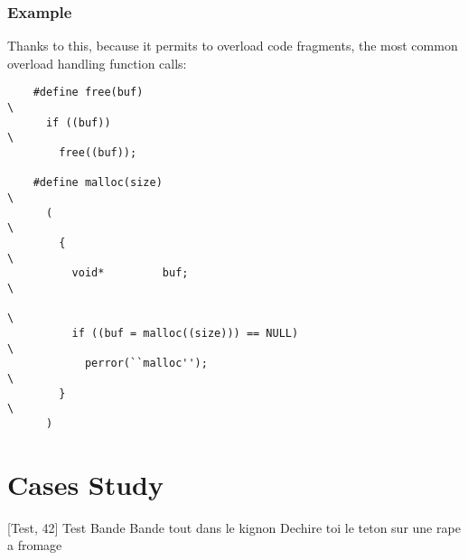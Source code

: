 \documentclass[9pt]{beamer}
\begin{document}
\begin{frame}[containsverbatim]
  \frametitle{Example}

  Thanks to this, because it permits to overload code fragments, the most
  common overload handling function calls:

  \begin{verbatim}
    #define free(buf)                                                   \
      if ((buf))                                                        \
        free((buf));

    #define malloc(size)                                                \
      (                                                                 \
        {                                                               \
          void*         buf;                                            \
                                                                        \
          if ((buf = malloc((size))) == NULL)                           \
            perror(``malloc'');                                         \
        }                                                               \
      )
  \end{verbatim}
\end{frame}

\section{Cases Study}


%
%

\begin{thebibliography}{10}

  \bibitem{Test}[Test, 42]
    Test Bande
    \newblock Bande tout dans le kignon
    \newblock Dechire toi le teton sur une rape a fromage

\end{thebibliography}
\end{document}
